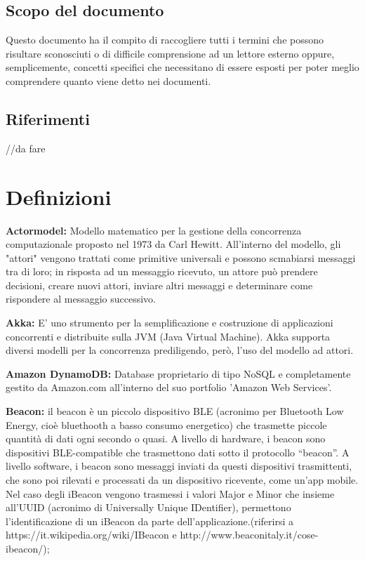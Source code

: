 \documentclass{scalatekids-article}
\begin{document}
\subsection{Scopo del documento}
Questo documento ha il compito di raccogliere tutti i termini che possono risultare sconosciuti o di difficile comprensione ad un lettore esterno oppure, semplicemente, concetti specifici che necessitano di essere esposti per poter meglio comprendere quanto viene detto nei documenti.
\subsection{Riferimenti} //da fare
\newpage
\section{Definizioni}


\textbf{Actormodel:} Modello matematico per la gestione della concorrenza computazionale proposto nel 1973 da Carl Hewitt.
All'interno del modello, gli "attori" vengono trattati come primitive universali e possono scmabiarsi messaggi tra di loro; in risposta ad un messaggio ricevuto, un attore può prendere decisioni, creare nuovi attori, inviare altri messaggi e determinare come rispondere al messaggio successivo.

\textbf{Akka:} E' uno strumento per la semplificazione e costruzione di applicazioni concorrenti e distribuite sulla JVM (Java Virtual Machine). Akka supporta diversi modelli per la concorrenza prediligendo, però, l'uso del modello ad attori.

\textbf{Amazon DynamoDB:} Database proprietario di tipo NoSQL e completamente gestito da Amazon.com all'interno del suo portfolio 'Amazon Web Services'.


\textbf{Beacon:} il beacon è un piccolo dispositivo BLE (acronimo per Bluetooth Low Energy, cioè bluethooth a basso consumo energetico) che trasmette piccole quantità di dati ogni secondo o quasi.  A livello di hardware, i beacon sono dispositivi BLE-compatible che trasmettono dati sotto il protocollo “beacon”.
A livello software, i beacon sono messaggi inviati da questi dispositivi trasmittenti, che sono poi rilevati e processati da un dispositivo ricevente, come un’app mobile. Nel caso degli iBeacon vengono trasmessi i valori Major e Minor che insieme all’UUID (acronimo di Universally Unique IDentifier), permettono l’identificazione di un iBeacon da parte dell’applicazione.(riferirsi a https://it.wikipedia.org/wiki/IBeacon e http://www.beaconitaly.it/cose-ibeacon/);
\end{document}
